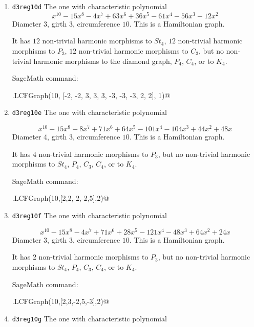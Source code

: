 \documentclass[12pt,letterpaper]{article}
\theoremstyle{definition}
\begin{document}
\begin{enumerate}
\item
  {\tt d3reg10d}\newline
The one with %
characteristic polynomial  
\[
x^{10} - 15x^8 - 4x^7 + 63x^6 + 36x^5 - 61x^4 - 56x^3 - 12x^2 
\]
Diameter $3$,
girth $3$,
circumference $10$.
This is a Hamiltonian graph.

It has $12$ non-trivial harmonic morphisms to $St_4$,
$12$ non-trivial harmonic morphisms to $P_3$,
$12$ non-trivial harmonic morphisms to $C_3$,
but no non-trivial harmonic morphisms to the diamond graph,
$P_4$, $C_4$, or to $K_4$.

SageMath command:

\verb@graphs.LCFGraph(10, [-2, -2, 3, 3, 3, -3, -3, -3, 2, 2], 1)@


\item
  {\tt d3reg10e}\newline
The one with %
characteristic polynomial  

\[
x^{10} - 15x^8 - 8x^7 + 71x^6 + 64x^5 - 101x^4 - 104x^3 + 44x^2 + 48x 
\]
Diameter $4$,
girth $3$,
circumference $10$.
This is a Hamiltonian graph.%

It has $4$ non-trivial harmonic morphisms to $P_3$,
but no non-trivial harmonic morphisms to $St_4$, $P_4$, $C_3$, $C_4$,
or to $K_4$.

SageMath command:

\verb@graphs.LCFGraph(10,[2,2,-2,-2,5],2)@


\item
  {\tt d3reg10f}\newline
The one with %
characteristic polynomial  

\[
x^{10} - 15x^8 - 4x^7 + 71x^6 + 28x^5 - 121x^4 - 48x^3 + 64x^2 + 24x 
\]
Diameter $3$,
girth $3$,
circumference $10$.
This is a Hamiltonian graph.

It has $2$ non-trivial harmonic morphisms to $P_3$,
but no non-trivial harmonic morphisms to $St_4$, $P_4$, $C_3$, $C_4$, or to
$K_4$.

SageMath command:

\verb@graphs.LCFGraph(10,[2,3,-2,5,-3],2)@


\item
  {\tt d3reg10g}\newline
The one with %
characteristic polynomial  


\end{enumerate}
\end{document}
